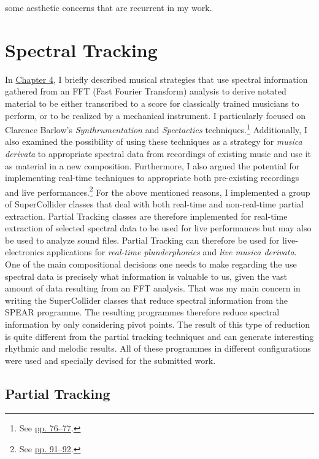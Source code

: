 some aesthetic concerns that are recurrent in my work.

\hypertarget{spectrack}{}
\section{Spectral Tracking}

In \hyperlink{chapter4}{Chapter 4}, I briefly described musical strategies that use spectral information gathered from an FFT (Fast Fourier Transform) analysis to derive notated material to be either transcribed to a score for classically trained musicians to perform, or to be realized by a mechanical instrument. I particularly focused on Clarence Barlow's \emph{Synthrumentation} and \emph{Spectactics} techniques.\footnote{See \hyperlink{spectactics}{pp. 76--77}.} Additionally, I also examined the possibility of using these techniques as a strategy for \emph{musica derivata} to appropriate spectral data from recordings of existing music and use it as material in a new composition. Furthermore, I also argued the potential for implementing real-time techniques to appropriate both pre-existing recordings and live performances.\footnote{See \hyperlink{realtimeplunderfuck}{pp. 91--92}.} For the above mentioned reasons, I implemented a group of SuperCollider classes that deal with both real-time and non-real-time partial extraction. Partial Tracking classes are therefore implemented for real-time extraction of selected spectral data to be used for live performances but may also be used to analyze sound files. Partial Tracking can therefore be used for live-electronics applications for \emph{real-time plunderphonics} and \emph{live musica derivata}. One of the main compositional decisions one needs to make regarding the use spectral data is precisely what information is valuable to us, given the vast amount of data resulting from an FFT analysis. That was my main concern in writing the SuperCollider classes that reduce spectral information from the SPEAR programme. The resulting programmes therefore reduce spectral information by only considering pivot points. The result of this type of reduction is quite different from the partial tracking techniques and can generate interesting rhythmic and melodic results. All of these programmes in different configurations were used and specially devised for the submitted work. 

\subsection{Partial Tracking}

